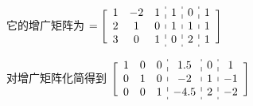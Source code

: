 它的增广矩阵为
\begin{math}
    [ { \begin{array}{c:c:c:c} 
        \begin{matrix} v_1&v_2&v_3 \end{matrix} &
        \begin{matrix} w_1 \end{matrix} &
        \begin{matrix} w_2 \end{matrix} &
        \begin{matrix} w_3 \end{matrix} 
    \end{array}} ] = \Bigg [ {\begin{array}{c:c:c:c} 
        \begin{matrix} 1&-2&1\\2&1&0\\3&0&1 \end{matrix} &
        \begin{matrix} 1\\1\\0 \end{matrix} &
        \begin{matrix} 0\\1\\2 \end{matrix} &
        \begin{matrix} 1\\1\\1 \end{matrix} 
    \end{array}}
    \Bigg ]
\end{math}

对增广矩阵化简得到
\begin{math}
    \Bigg [ {\begin{array}{c:c:c:c} 
    \begin{matrix} 1&0&0\\0&1&0\\0&0&1 \end{matrix} &
    \begin{matrix} 1.5\\-2\\-4.5 \end{matrix} &
    \begin{matrix} 0\\1\\2 \end{matrix} &
    \begin{matrix} 1\\-1\\-2 \end{matrix} 
\end{array}}
\Bigg ]
\end{math}

